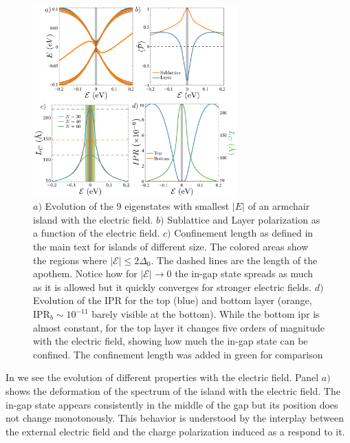 \begin{figure}[!ht!]
\centering
\includegraphics[width=0.7\textwidth]{artlat/fig/spectrum.pdf}
\vspace{-10pt}
\caption{$a)$ Evolution of the 9 eigenstates with smallest $|E|$ of an armchair island with the electric field. $b)$ Sublattice and Layer polarization as a function of the electric field. $c)$ Confinement length as defined in the main text for islands of different size. The colored areas show the regions where $|\mathcal{E}|\leqslant2\Delta_0$. The dashed lines are the length of the apothem. Notice how for $|\mathcal{E}|\to0$ the in-gap state spreads as much as it is allowed but it quickly converges for stronger electric fields. $d)$ Evolution of the IPR for the top (blue) and bottom layer (orange, $\text{IPR}_b\sim10^{-11}$ barely visible at the bottom). While the bottom \ac{ipr} is almost constant, for the top layer it changes five orders of magnitude with the electric field, showing how much the in-gap state can be confined. The confinement length was added in green for comparison}
\label{spectrum}
\end{figure}
In  we see the evolution of different properties with the electric field. Panel $a)$ shows the deformation of the spectrum of the island with the electric field. The in-gap state appears consistently in the middle of the gap but its position does not change monotonously. This behavior is understood by the interplay between the external electric field and the charge polarization induced as a respond to it.


